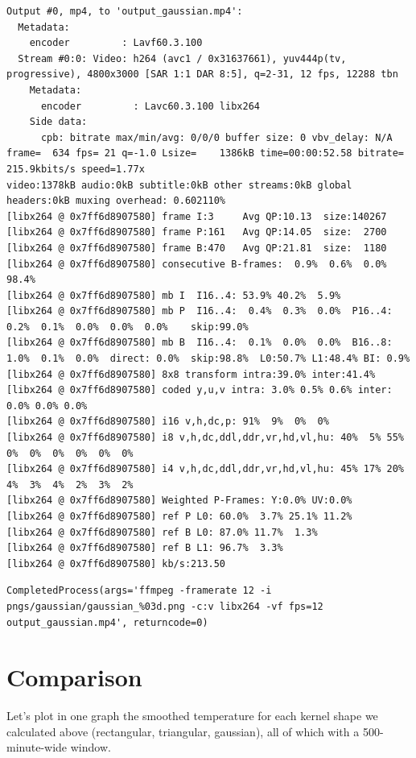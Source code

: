 \documentclass[
  letterpaper,
  DIV=11,
  numbers=noendperiod,
  oneside]{scrreprt}
\begin{document}
\begin{verbatim}
Output #0, mp4, to 'output_gaussian.mp4':
  Metadata:
    encoder         : Lavf60.3.100
  Stream #0:0: Video: h264 (avc1 / 0x31637661), yuv444p(tv, progressive), 4800x3000 [SAR 1:1 DAR 8:5], q=2-31, 12 fps, 12288 tbn
    Metadata:
      encoder         : Lavc60.3.100 libx264
    Side data:
      cpb: bitrate max/min/avg: 0/0/0 buffer size: 0 vbv_delay: N/A
frame=  634 fps= 21 q=-1.0 Lsize=    1386kB time=00:00:52.58 bitrate= 215.9kbits/s speed=1.77x     
video:1378kB audio:0kB subtitle:0kB other streams:0kB global headers:0kB muxing overhead: 0.602110%
[libx264 @ 0x7ff6d8907580] frame I:3     Avg QP:10.13  size:140267
[libx264 @ 0x7ff6d8907580] frame P:161   Avg QP:14.05  size:  2700
[libx264 @ 0x7ff6d8907580] frame B:470   Avg QP:21.81  size:  1180
[libx264 @ 0x7ff6d8907580] consecutive B-frames:  0.9%  0.6%  0.0% 98.4%
[libx264 @ 0x7ff6d8907580] mb I  I16..4: 53.9% 40.2%  5.9%
[libx264 @ 0x7ff6d8907580] mb P  I16..4:  0.4%  0.3%  0.0%  P16..4:  0.2%  0.1%  0.0%  0.0%  0.0%    skip:99.0%
[libx264 @ 0x7ff6d8907580] mb B  I16..4:  0.1%  0.0%  0.0%  B16..8:  1.0%  0.1%  0.0%  direct: 0.0%  skip:98.8%  L0:50.7% L1:48.4% BI: 0.9%
[libx264 @ 0x7ff6d8907580] 8x8 transform intra:39.0% inter:41.4%
[libx264 @ 0x7ff6d8907580] coded y,u,v intra: 3.0% 0.5% 0.6% inter: 0.0% 0.0% 0.0%
[libx264 @ 0x7ff6d8907580] i16 v,h,dc,p: 91%  9%  0%  0%
[libx264 @ 0x7ff6d8907580] i8 v,h,dc,ddl,ddr,vr,hd,vl,hu: 40%  5% 55%  0%  0%  0%  0%  0%  0%
[libx264 @ 0x7ff6d8907580] i4 v,h,dc,ddl,ddr,vr,hd,vl,hu: 45% 17% 20%  4%  3%  4%  2%  3%  2%
[libx264 @ 0x7ff6d8907580] Weighted P-Frames: Y:0.0% UV:0.0%
[libx264 @ 0x7ff6d8907580] ref P L0: 60.0%  3.7% 25.1% 11.2%
[libx264 @ 0x7ff6d8907580] ref B L0: 87.0% 11.7%  1.3%
[libx264 @ 0x7ff6d8907580] ref B L1: 96.7%  3.3%
[libx264 @ 0x7ff6d8907580] kb/s:213.50
\end{verbatim}

\begin{verbatim}
CompletedProcess(args='ffmpeg -framerate 12 -i pngs/gaussian/gaussian_%03d.png -c:v libx264 -vf fps=12 output_gaussian.mp4', returncode=0)
\end{verbatim}

\hypertarget{comparison}{%
\section{Comparison}\label{comparison}}

Let's plot in one graph the smoothed temperature for each kernel shape
we calculated above (rectangular, triangular, gaussian), all of which
with a 500-minute-wide window.
\end{document}
